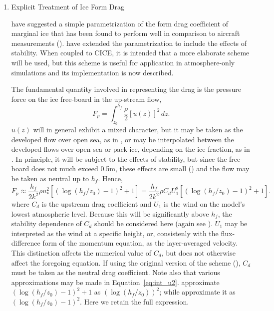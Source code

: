 \documentclass{UMDP_article}
\begin{document}
\begin{enumerate}
\item
{Explicit Treatment of Ice Form Drag}

\cite{lupkes2012} have suggested a simple parametrization of the
form drag coefficient of marginal ice that has been found to
perform well in comparison to aircraft measurements (\cite{elvidge2016}).
\cite{lupkes2015} have extended the parametrization to include the effects
of stability. When coupled to CICE, it is intended that a more elaborate
scheme will be used, but this scheme is useful for application in
atmosphere-only simulations and its implementation is now described.

The fundamental quantity involved in representing the drag is the
pressure force on the ice free-board in the up-stream flow,
\begin{equation}
F_p =\int_{z_0}^{h_f} \frac{\rho}{2} [u(z)]^2 \, dz.
\end{equation}
$u(z)$ will in general exhibit a mixed character, but it may be taken as
the developed flow over open sea, as in \cite{lupkes2012}, or may be
interpolated between the developed flows over open sea or pack ice, depending
on the ice fraction, as in \cite{lupkes2015}. 
In principle, it will be subject to the effects of stability, but
since the free-board does not much exceed 0.5m, these effects are small
(\cite{lupkes2015}) and the flow may be taken as neutral up to $h_f$.
Hence,
\begin{equation}
F_p \approx \frac{h_f}{2k^2} \rho u_*^2 \left [ (\log(h_f/z_0) -1)^2 +1
\right ] =
\frac{h_f}{2k^2} \rho C_d U_1^2 \left [(\log(h_f/z_0) -1)^2 +1 \right ].
\label{eq:int_u2}
\end{equation}
where $C_d$ is the upstream drag coefficient and $U_1$ is the wind
on the model's lowest atmospheric level. Because this will be
significantly above $h_f$, the stability dependence of $C_d$ should
be considered here (again see \cite{lupkes2015}). $U_1$ may be interpreted
as the wind at a specific height, or, consistenly with the flux-difference
form of the momentum equation, as the layer-averaged velocity. This
distinction affects the numerical value of $C_d$, but does not otherwise
affect the foregoing equation. If using the original version of the
scheme (\cite{lupkes2012}), $C_d$ must be taken as the neutral drag
coefficient. Note also that various approximations may be made in
Equation~\ref{eq:int_u2}. \cite{lupkes2012} approximate
$(\log(h_f/z_0) -1)^2 +1$ as $(\log(h_f/z_0) )^2 $; while \cite{lupkes2015}
approximate it as $(\log(h_f/z_0) -1)^2 $. Here we retain the full expression.


\end{enumerate}
\end{document}

